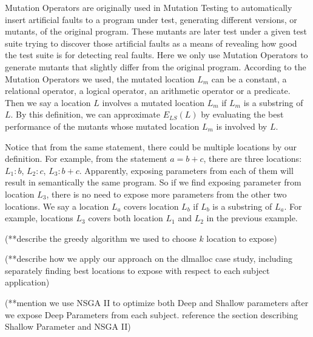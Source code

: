 Mutation Operators are originally used in Mutation Testing to automatically insert artificial faults to a program under test, generating different versions, or mutants, of the original program. These mutants are later test under a given test suite trying to discover those artificial faults as a means of revealing how good the test suite is for detecting real faults. Here we only use Mutation Operators to generate mutants that slightly differ from the original program. According to the Mutation Operators we used, the mutated location $L_m$ can be a constant, a relational operator, a logical operator, an arithmetic operator or a predicate. Then we say a location $L$ involves a mutated location $L_m$ if $L_m$ is a substring of $L$. By this definition, we can approximate $E_{LS}(L)$ by evaluating the best performance of the mutants whose mutated location $L_m$ is involved by $L$. 

Notice that from the same statement, there could be multiple locations by our definition. For example, from the statement $a=b+c$, there are three locations: $L_1:b$, $L_2:c$, $L_3:b+c$. Apparently, exposing parameters from each of them will result in semantically the same program. So if we find exposing parameter from location $L_3$, there is no need to expose more parameters from the other two locations. We say a location $L_a$ covers location $L_b$ if $L_b$ is a substring of $L_a$. For example, locations $L_3$ covers both location $L_1$ and $L_2$ in the previous example. 

(**describe the greedy algorithm we used to choose $k$ location to expose)

(**describe how we apply our approach on the dlmalloc case study, including separately finding best locations to expose with respect to each subject application)

(**mention we use NSGA II to optimize both Deep and Shallow parameters after we expose Deep Parameters from each subject. reference the section describing Shallow Parameter and NSGA II)

